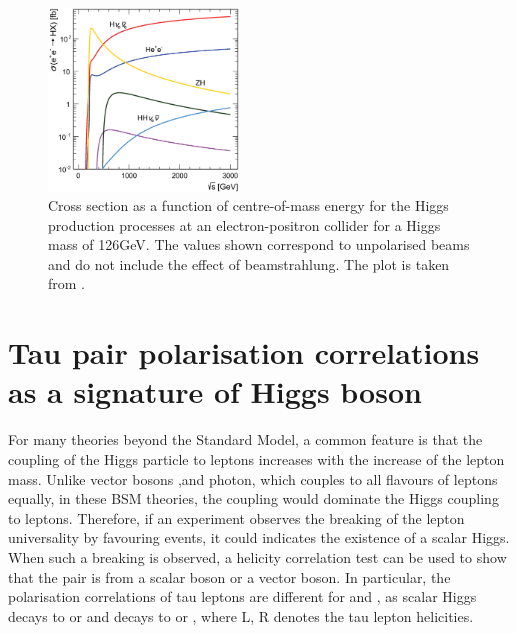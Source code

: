 \begin{figure}[!htbp]
\centering
\includegraphics[width=0.45\textwidth]{theory/HiggsCLICcrossSection}
\caption[]
{Cross section as a function of centre-of-mass energy for the Higgs production processes at an electron-positron collider for a Higgs mass of 126GeV. The values shown correspond
to unpolarised beams and do not include the effect of beamstrahlung. The plot is taken from \cite{Abramowicz:2016zbo}.}
\label{fig:theoryHiggsCrossSection}
\end{figure}


\section{Tau pair polarisation correlations as a signature of Higgs boson}
\label{sec:theoryTauPair}
For many theories beyond the Standard Model, a common feature is that the coupling of the Higgs particle to leptons increases with the increase of the lepton mass. Unlike vector bosons ,\PZ and photon,  which couples to all flavours of leptons equally, in these BSM theories, the \HigssTauTau coupling would dominate the Higgs coupling to leptons. Therefore, if an experiment observes the breaking of the lepton universality by favouring \TauTau events, it could indicates the existence of a scalar Higgs. When such a breaking is observed, a helicity correlation test can be used to show that the \TauTau pair is from a scalar boson or a vector boson. In particular, the polarisation correlations of tau leptons are different for \HiggsToTauTau and \ZToTauTau, as scalar Higgs decays to  or  and \PZ decays to  or , where L, R denotes the tau lepton helicities.


